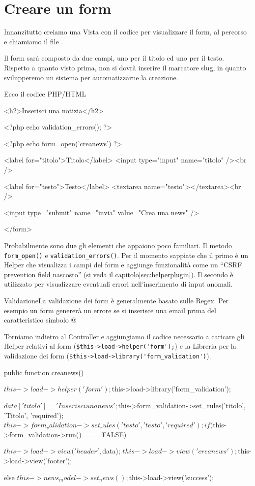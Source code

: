 \section{Creare un form}
Innanzitutto creiamo una Vista con il codice per visualizzare il form, al percorso  e chiamiamo il file . 

Il form sarà composto da due campi, uno per il titolo ed uno per il testo. Rispetto a quanto visto prima, non si dovrà inserire il marcatore slug, in quanto svilupperemo un sistema per automatizzarne la creazione.

Ecco il codice \ac{PHP}/\ac{HTML}

\begin{code}
<h2>Inserisci una notizia</h2>

<?php echo validation_errors(); ?>

<?php echo form_open('creanews') ?>

	<label for="titolo">Titolo</label>
	<input type="input" name="titolo" /><br />

	<label for="testo">Testo</label>
	<textarea name="testo"></textarea><br />

	<input type="submit" name="invia" value="Crea una news" />

</form>
\end{code}

Probabilmente sono due gli elementi che appaiono poco familiari. Il metodo \verb|form_open()| e \verb|validation_errors()|. Per il momento sappiate che il primo è un Helper che visualizza i campi del form e aggiunge funzionalità come un ``CSRF prevention field nascosto'' (si veda il capitolo\vref{sec:helperplugin}). Il secondo è utilizzato per visualizzare eventuali errori nell'inserimento di input anomali.

\begin{deftab}{Validazione}{La validazione dei form è generalmente basato sulle Regex. Per esempio un form genererà un errore se si inserisce una email prima del caratteristico simbolo @}
\end{deftab}

Torniamo indietro al Controller  e aggiungiamo il codice necessario a caricare gli Helper relativi al form (\verb|$this->load->helper('form');|) e la Libreria per la validazione dei form (\verb|$this->load->library('form_validation')|).

\begin{code}
public function creanews()
{
	$this->load->helper('form');
	$this->load->library('form_validation');

	$data['titolo'] = 'Inserisci una news';

	$this->form_validation->set_rules('titolo', 'Titolo', 'required');
	$this->form_validation->set_rules('testo', 'testo', 'required');

	if ($this->form_validation->run() === FALSE)
	{
		$this->load->view('header', $data);
		$this->load->view('creanews');
		$this->load->view('footer');

	}
	else
	{
		$this->news_model->set_news();
		$this->load->view('success');
	}
}
\end{code}

